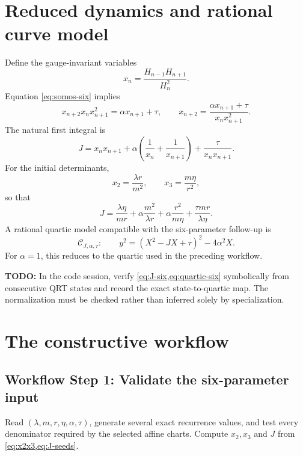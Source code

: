 \documentclass[11pt]{article}
\newcommand{\workflowstep}[1]{\subsection{Workflow Step #1}}
\newcommand{\taupar}{\tau}
\newcommand{\TODO}[1]{\par\noindent\textcolor{red!70!black}{\textbf{TODO:} #1}\par}
\begin{document}
\section{Reduced dynamics and rational curve model}
Define the gauge-invariant variables
\begin{equation}
 x_n=\frac{H_{n-1}H_{n+1}}{H_n^2}.
 \label{eq:xn}
\end{equation}
Equation \cref{eq:somos-six} implies
\begin{equation}
 x_{n+2}x_nx_{n+1}^2=\alpha x_{n+1}+\taupar,
 \qquad
 x_{n+2}=\frac{\alpha x_{n+1}+\taupar}{x_nx_{n+1}^2}.
 \label{eq:qrt-six}
\end{equation}
The natural first integral is
\begin{equation}
 J=x_nx_{n+1}+\alpha\left(\frac1{x_n}+\frac1{x_{n+1}}\right)
   +\frac{\taupar}{x_nx_{n+1}}.
 \label{eq:J-six}
\end{equation}
For the initial determinants,
\begin{equation}
 x_2=\frac{\lambda r}{m^2},\qquad
 x_3=\frac{m\eta}{r^2},
 \label{eq:x2x3}
\end{equation}
so that
\begin{equation}
 J=\frac{\lambda\eta}{mr}
 +\alpha\frac{m^2}{\lambda r}
 +\alpha\frac{r^2}{m\eta}
 +\frac{\taupar mr}{\lambda\eta}.
 \label{eq:J-seeds}
\end{equation}
A rational quartic model compatible with the six-parameter follow-up is
\begin{equation}
 \mathcal C_{J,\alpha,\taupar}:\qquad
 y^2=(X^2-JX+\taupar)^2-4\alpha^2X.
 \label{eq:quartic-six}
\end{equation}
For $\alpha=1$, this reduces to the quartic used in the preceding workflow.

\TODO{In the code session, verify \cref{eq:J-six,eq:quartic-six} symbolically
from consecutive QRT states and record the exact state-to-quartic map.  The
normalization must be checked rather than inferred solely by specialization.}

\section{The constructive workflow}

\workflowstep{1: Validate the six-parameter input}
Read $(\lambda,m,r,\eta,\alpha,\taupar)$, generate several exact recurrence
values, and test every denominator required by the selected affine charts.
Compute $x_2,x_3$ and $J$ from \cref{eq:x2x3,eq:J-seeds}.
\end{document}
